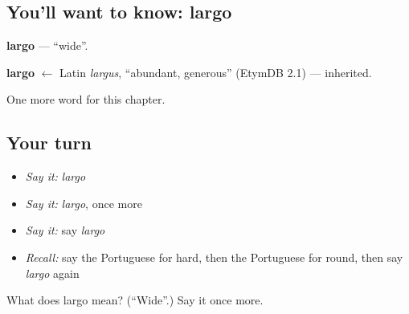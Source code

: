 \subsection*{You'll want to know: largo}
\textbf{largo} — \textquotedblleft{}wide\textquotedblright{}.

\begin{cousinweb}
\textbf{largo} $\leftarrow$ Latin \emph{largus}, \textquotedblleft{}abundant, generous\textquotedblright{} (EtymDB 2.1) — inherited.
\end{cousinweb}

\begin{grammarlens}[title={What you've built}]
One more word for this chapter.
\end{grammarlens}

\subsection*{Your turn}
\begin{itemize}
\raggedright
  \item \emph{Say it:} \emph{largo}
  \item \emph{Say it:} \emph{largo}, once more
  \item \emph{Say it:} say \emph{largo}
  \item \emph{Recall:} say the Portuguese for hard, then the Portuguese for round, then say \emph{largo} again
\end{itemize}

\begin{tcolorbox}[breakable,colback=teal!4,colframe=teal!35!black,title={Before you move on}]
What does largo mean? (\textquotedblleft{}Wide\textquotedblright{}.) Say it once more.
\end{tcolorbox}
